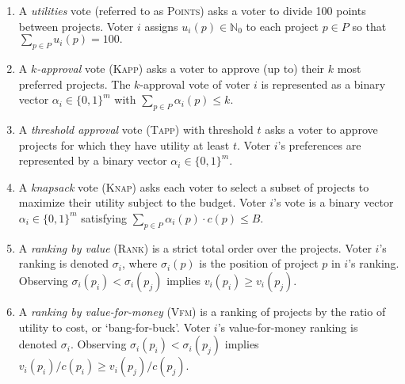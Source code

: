 \documentclass[twoside,11pt]{article}
\newcommand{\kibitz}[2]{\ifnum\Comments=1{\color{#1}{#2}}\fi}
\newcommand{\kg}[1]{\kibitz{brown}{[Kobi says:#1]}}
\newcommand{\points}{\textsc{Points}}
\newcommand{\rank}{\textsc{Rank}}
\newcommand{\vfm}{\textsc{Vfm}}
\newcommand{\knap}{\textsc{Knap}}
\newcommand{\kapp}{\textsc{Kapp}}
\newcommand{\tapp}{\textsc{Tapp}}
\begin{document}
\begin{enumerate}
    \item A \textit{utilities}  vote  (referred to as \points) asks a voter to divide 100 points between projects. Voter $i$ assigns $u_i(p) \in \mathbb{N}_0$ to each project $p\in P$ so that $\sum_{p\in P} u_i(p) =100. $ 
       
     \item  A \textit{$k$-approval}   vote (\kapp) asks a voter to approve (up to) their  $k$ most preferred projects. The $k$-approval vote of voter $i$ is represented as a binary vector $\alpha_i\in\{0,1\}^m$ with $\sum_{p\in P}\alpha_i(p)\leq k$.
      
    
    \item A \textit{threshold approval} vote  (\tapp) with threshold $t$ asks a voter to approve projects for which they have utility  at least $t$.  Voter $i$'s preferences are represented by a  binary vector $\alpha_i\in\{0,1\}^m$. 
    
    \item A \textit{knapsack} vote  (\knap)   asks each voter to select a subset of projects to maximize their utility subject to the budget. Voter $i$'s vote is a binary vector $\alpha_i\in\{0,1\}^m$ satisfying $\sum_{p\in P}  \alpha_i(p) \cdot c(p) \leq B$. %
    
    \item A \textit{ranking by value} (\rank)  is a strict total order over the projects. Voter $i$'s ranking is denoted $\sigma_i$, where  $\sigma_i(p)$ is the position of project $p$ in $i$'s ranking.  Observing   $\sigma_i(p_i) < \sigma_i( p_j)$    implies $v_i(p_i) \geq v_i(p_j)$. %

    \item A \textit{ranking by value-for-money} (\vfm) is a ranking of projects by the ratio of utility to cost, or `bang-for-buck'.  Voter $i$'s value-for-money ranking is denoted $\sigma_i$. Observing   $\sigma_i(p_i) < \sigma_i( p_j)$    implies $v_i(p_i)/c(p_i) \geq v_i(p_j)/c(p_j)$.
\end{enumerate}
\end{document}
